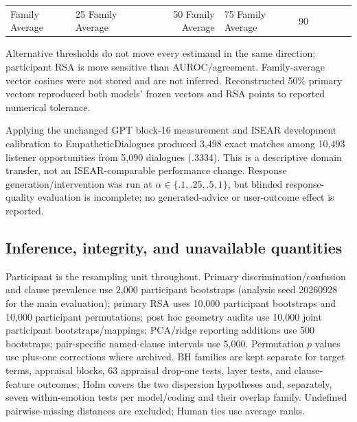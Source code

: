 \begin{table}[t]
{\begin{tabular}{llrllllll}
Family Average & 25%
Family Average & 50%
Family Average & 75%
Family Average & 90%
\bottomrule
\end{tabular}
}
\end{table}

Alternative thresholds do not move every estimand in the same direction; participant RSA is more sensitive than AUROC/agreement. Family-average vector cosines were not stored and are not inferred. Reconstructed 50\% primary vectors reproduced both models' frozen vectors and RSA points to reported numerical tolerance.

Applying the unchanged GPT block-16 measurement and ISEAR development calibration to EmpatheticDialogues produced 3,498 exact matches among 10,493 listener opportunities from 5,090 dialogues (.3334). This is a descriptive domain transfer, not an ISEAR-comparable performance change. Response generation/intervention was run at $\alpha\in\{.1,.25,.5,1\}$, but blinded response-quality evaluation is incomplete; no generated-advice or user-outcome effect is reported.

\subsection{Inference, integrity, and unavailable quantities}
\label{app:integrity}

Participant is the resampling unit throughout. Primary discrimination/confusion and clause prevalence use 2,000 participant bootstraps (analysis seed 20260928 for the main evaluation); primary RSA uses 10,000 participant bootstraps and 10,000 participant permutations; post hoc geometry audits use 10,000 joint participant bootstraps/mappings; PCA/ridge reporting additions use 500 bootstraps; pair-specific named-clause intervals use 5,000. Permutation $p$ values use plus-one corrections where archived. BH families are kept separate for target terms, appraisal blocks, 63 appraisal drop-one tests, layer tests, and clause-feature outcomes; Holm covers the two dispersion hypotheses and, separately, seven within-emotion tests per model/coding and their overlap family. Undefined pairwise-missing distances are excluded; Human ties use average ranks.

